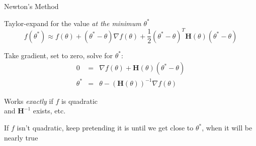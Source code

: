 \documentclass[8pt,ignorenonframetext,]{beamer}
\begin{document}
\begin{frame}{Newton's Method}

Taylor-expand for the value \emph{at the minimum} \(\theta^*\) \[
    f(\theta^*) \approx f(\theta) + (\theta^*-\theta) \nabla f(\theta) +
      \frac{1}{2}(\theta^*-\theta)^T \mathbf{H}(\theta) (\theta^*-\theta)
    \]

Take gradient, set to zero, solve for \(\theta^*\): \[
    \begin{eqnarray*}
    0 & = & \nabla f(\theta) + \mathbf{H}(\theta) (\theta^*-\theta) \\
    \theta^* & = & \theta - {\left(\mathbf{H}(\theta)\right)}^{-1} \nabla f(\theta)
    \end{eqnarray*}
    \]

Works \emph{exactly} if \(f\) is quadratic\\
and \(\mathbf{H}^{-1}\) exists, etc.

If \(f\) isn't quadratic, keep pretending it is until we get close to
\(\theta^*\), when it will be nearly true

\end{frame}
\end{document}
